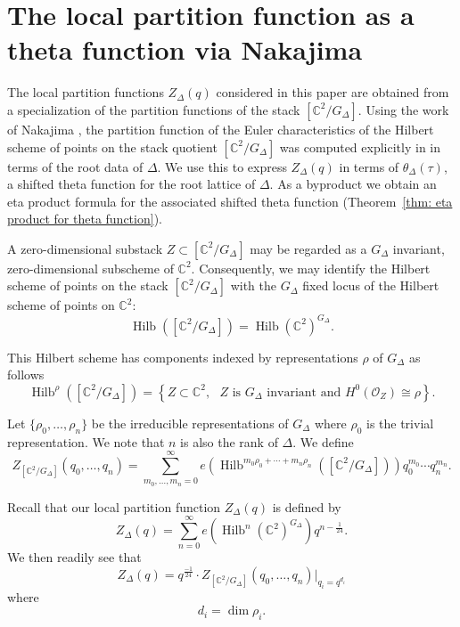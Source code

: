 \documentclass{amsart}
\theoremstyle{definition}
\newcommand{\CC} {{\mathbb C}}          %
\renewcommand{\O}{\mathcal{O}}
\newcommand{\Hilb}{\operatorname{Hilb}}
\begin{document}
\section{The local partition function as a theta function via Nakajima}\label{sec: local partition functions}


The local partition functions $Z_{\Delta}(q)$ considered in this paper
are obtained from a specialization of the partition functions of the
stack $[\CC^{2} /G_{\Delta}]$.  Using the work of Nakajima
\cite{nakajima2002geometric}, the partition function of the Euler
characteristics of the Hilbert scheme of points on the stack quotient
$[\CC^{2}/G_{\Delta}]$ was computed explicitly in
\cite{gyenge2015euler} in terms of the root data of $\Delta$.  We use
this to express $Z_{\Delta}(q)$ in terms of $\theta_{\Delta}(\tau )$,
a shifted theta function for the root lattice of $\Delta$. As a
byproduct we obtain an eta product formula for the associated shifted
theta function (Theorem~\ref{thm: eta product for theta function}).



A zero-dimensional substack $Z\subset [\CC^{2}/G_{\Delta}]$ may be
regarded as a $G_{\Delta}$ invariant, zero-dimensional subscheme of
$\CC^{2}$. Consequently, we may identify the Hilbert scheme of points
on the stack $[\CC^{2}/G_{\Delta}]$ with the $G_{\Delta}$ fixed locus
of the Hilbert scheme of points on $\CC^{2}$: 
\[
\Hilb \left([\CC^{2}/G_{\Delta}] \right) = \Hilb
(\CC^{2})^{G_{\Delta}} .
\]

This Hilbert scheme has components indexed by representations $\rho$
of $G_{\Delta}$ as follows
\begin{equation*}
\Hilb^{\rho} \left([\CC^{2}/G_{\Delta}] \right) = \left\{ Z\subset
\CC^{2}, \text{ $Z$ is $G_{\Delta}$ invariant and $H^{0}(\O_{Z})\cong
\rho $} \right\}.
\end{equation*}

Let $\{\rho_{0},\dotsc ,\rho_{n} \}$ be the irreducible
representations of $G_{\Delta}$ where $\rho_{0}$ is the trivial
representation. We note that $n$ is also the rank of $\Delta$. We
define
\[
Z_{[\CC^{2}/G_{\Delta}]} (q_{0},\dotsc ,q_{n}) = \sum_{m_{0},\dotsc
,m_{n}=0}^{\infty} e\left(\Hilb^{m_{0}\rho_{0}+\dotsb
+m_{n}\rho_{n}}([\CC^{2}/G_{\Delta}]) \right) q_{0}^{m_{0}}\dotsb
q_{n}^{m_{n}} .
\]

Recall that our local partition function $Z_{\Delta}(q)$ is defined by
\[
Z_{\Delta}(q) = \sum_{n=0}^{\infty}
e\left(\Hilb^{n}(\CC^{2})^{G_{\Delta}} \right) q^{n-\frac{1}{24}}. 
\]
We then readily see that
\[
Z_{\Delta}(q) = q^{\frac{-1}{24}}\cdot  Z_{[\CC^{2}/G_{\Delta}]}
(q_{0},\dotsc ,q_{n})|_{q_{i}=q^{d_{i}}}
\]
where
\[
d_{i} =\dim \rho_{i}.
\]
\end{document}
